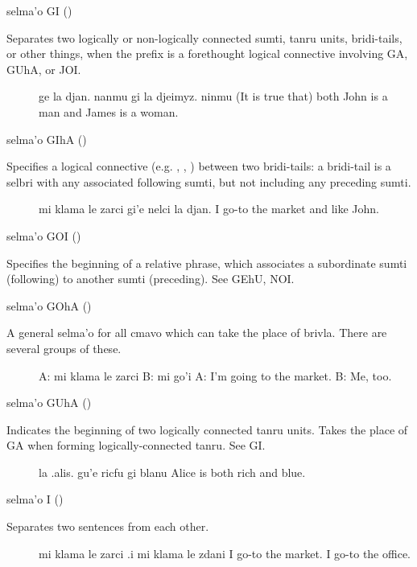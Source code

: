 selma'o GI () 

Separates two logically or non-logically connected sumti,
    tanru units, bridi-tails, or other things, when the prefix is a
    forethought logical connective involving GA, GUhA, or JOI.
\begin{description}
\item[] ge la djan. nanmu gi la djeimyz. ninmu (It is true that) both John is a man and James is a woman.
\end{description}

selma'o GIhA () 

Specifies a logical connective (e.g. , ,
    ) between two bridi-tails: a bridi-tail is a selbri with
    any associated following sumti, but not including any preceding
    sumti.
\begin{description}
\item[] mi klama le zarci gi'e nelci la djan. I go-to the market and like John.
\end{description}

selma'o GOI () 

Specifies the beginning of a relative phrase, which
    associates a subordinate sumti (following) to another sumti
    (preceding). See GEhU, NOI.

selma'o GOhA () 

A general selma'o for all cmavo which can take the place of
    brivla. There are several groups of these.
\begin{description}
\item[] A: mi klama le zarci B: mi go'i A: I'm going to the market. B: Me, too.
\end{description}

selma'o GUhA () 

Indicates the beginning of two logically connected tanru
    units. Takes the place of GA when forming logically-connected
    tanru. See GI.
\begin{description}
\item[] la .alis. gu'e ricfu gi blanu Alice is both rich and blue.
\end{description}

selma'o I () 

Separates two sentences from each other.
\begin{description}
\item[] mi klama le zarci .i mi klama le zdani I go-to the market. I go-to the office.
\end{description}

